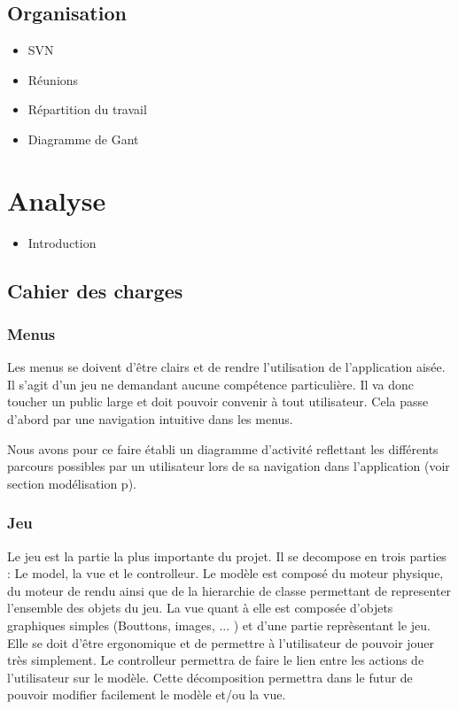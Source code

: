 \documentclass[]{report}
\begin{document}
	\section{Organisation}
		\begin{itemize}
			\item{SVN}
			\item{Réunions}
			\item{Répartition du travail}
			\item{Diagramme de Gant}
		\end{itemize}
	
	
\chapter{Analyse}
	\begin{itemize}
		\item{Introduction}
	\end{itemize}
	
	\section{Cahier des charges}
		\subsection{Menus}
		
		Les menus se doivent d'être clairs et de rendre l'utilisation de
		l'application aisée. Il s'agit d'un jeu ne demandant aucune compétence
		particulière. Il va donc toucher un public large et doit pouvoir convenir à
		tout utilisateur. Cela passe d'abord par une navigation intuitive dans les
		menus.
		
		Nous avons pour ce faire établi un diagramme d'activité reflettant les
		différents parcours possibles par un utilisateur lors de sa navigation dans
		l'application (voir section modélisation p\pageref{activité}).
		
		\subsection{Jeu}
		
		Le jeu est la partie la plus importante du projet. 
		Il se decompose en trois parties : Le model, la vue et le controlleur. 
		Le modèle est composé du moteur physique, du moteur de rendu ainsi que de la
		hierarchie de classe permettant de representer l'ensemble des objets du jeu. 
		La vue quant à elle est composée d'objets graphiques simples (Bouttons, images, ... ) 
		et d'une partie reprèsentant le jeu. Elle se doit d'être ergonomique et de permettre
		à l'utilisateur de pouvoir jouer très simplement. Le controlleur permettra de faire 
		le lien entre les actions de l'utilisateur sur le modèle. Cette décomposition permettra dans 
		le futur de pouvoir modifier facilement le modèle et/ou la vue.
		
\end{document}
